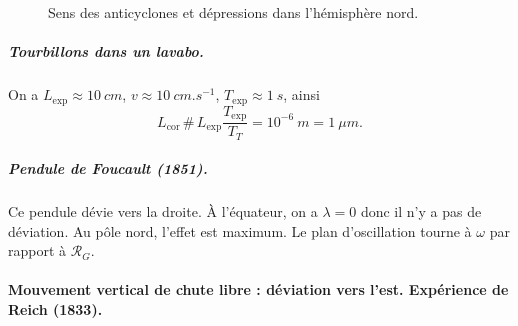 \begin{figure}
                        \caption{Sens des anticyclones et dépressions dans l'hémisphère nord.}
                        \label{fig:anticyclone_depression_hemisphere_nord}
                    \end{figure}

                \subparagraph{Tourbillons dans un lavabo.}

                    On a $L_{\text{exp}}\approx 10~cm$, $v\approx 10~cm.s^{-1}$, $T_{\text{exp}}\approx 1~s$, ainsi 
                    \begin{equation}
                        L_{\text{cor}}\,\#\,L_{\text{exp}}\frac{T_{\text{exp}}}{T_T}=10^{-6}~m=1~\mu m.
                    \end{equation}

                \subparagraph{Pendule de Foucault (1851).} Ce pendule dévie vers la droite. À l'équateur, on a $\lambda=0$ donc il n'y a pas de déviation. Au pôle nord, l'effet est maximum. Le plan d'oscillation tourne à $\omega$ par rapport à $\mathcal{R}_{G}$.
            
            \paragraph{Mouvement vertical de chute libre : déviation vers l'est. Expérience de Reich (1833).}

